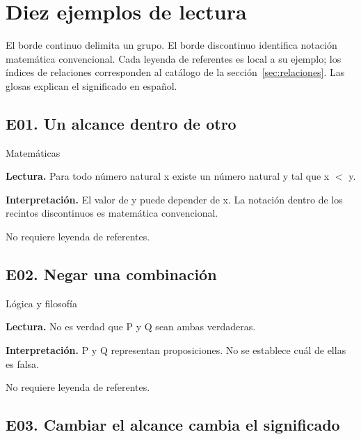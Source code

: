 \section{Diez ejemplos de lectura}\label{sec:ejemplos}

El borde continuo delimita un grupo. El borde discontinuo identifica
notación matemática convencional. Cada leyenda de referentes es local
a su ejemplo; los índices de relaciones corresponden al catálogo de la
sección~\ref{sec:relaciones}. Las glosas explican el significado en español.

\subsection{E01. Un alcance dentro de otro}

{\small\sffamily\color{KalaAcento}Matemáticas}


\textbf{Lectura.} Para todo número natural x existe un número natural y tal que x \ensuremath{<} y.

\textbf{Interpretación.} El valor de y puede depender de x. La notación dentro de los recintos discontinuos es matemática convencional.

{\small\color{KalaSuave}No requiere leyenda de referentes.}

\vspace{6mm}

\subsection{E02. Negar una combinación}

{\small\sffamily\color{KalaAcento}Lógica y filosofía}


\textbf{Lectura.} No es verdad que P y Q sean ambas verdaderas.

\textbf{Interpretación.} P y Q representan proposiciones. No se establece cuál de ellas es falsa.

{\small\color{KalaSuave}No requiere leyenda de referentes.}

\clearpage

\subsection{E03. Cambiar el alcance cambia el significado}

